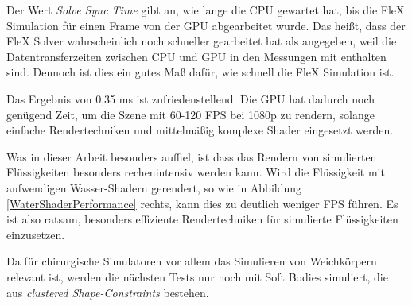 Der Wert \textit{Solve Sync Time} gibt an, wie lange die CPU gewartet hat, bis die FleX Simulation für einen Frame von der GPU abgearbeitet wurde. Das heißt, dass der FleX Solver wahrscheinlich noch schneller gearbeitet hat als angegeben, weil die Datentransferzeiten zwischen CPU und GPU in den Messungen mit enthalten sind. Dennoch ist dies ein gutes Maß dafür, wie schnell die FleX Simulation ist.

Das Ergebnis von 0,35 ms ist zufriedenstellend. Die GPU hat dadurch noch genügend Zeit, um die Szene mit 60-120 \ac{FPS} bei 1080p zu rendern, solange einfache Rendertechniken und mittelmäßig komplexe Shader eingesetzt werden. 

Was in dieser Arbeit besonders auffiel, ist dass das Rendern von simulierten Flüssigkeiten besonders rechenintensiv werden kann. Wird die Flüssigkeit mit aufwendigen Wasser-Shadern gerendert, so wie in Abbildung \ref{WaterShaderPerformance} rechts, kann dies zu deutlich weniger \ac{FPS} führen. Es ist also ratsam, besonders effiziente Rendertechniken für simulierte Flüssigkeiten einzusetzen.

Da für chirurgische Simulatoren vor allem das Simulieren von Weichkörpern relevant ist, werden die nächsten Tests nur noch mit Soft Bodies simuliert, die aus \textit{clustered Shape-Constraints} bestehen.

\clearpage
